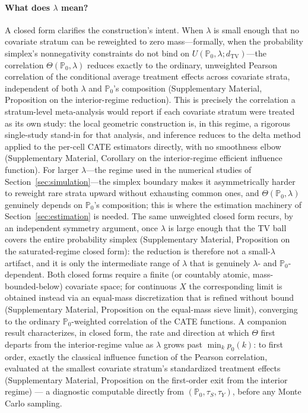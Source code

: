 \documentclass{article}
\newcommand{\PP}{\mathbb{P}}
\begin{document}
\paragraph{What does $\lambda$ mean?} A closed form clarifies the construction's
intent. When $\lambda$ is small enough that no covariate stratum can be reweighted to
zero mass---formally, when the probability simplex's nonnegativity constraints do not
bind on $U(\PP_0,\lambda;d_{\mathrm{TV}})$---the correlation $\Theta(\PP_0,\lambda)$
reduces exactly to the ordinary, unweighted Pearson correlation of the conditional
average treatment effects across covariate strata, independent of both $\lambda$ and
$\PP_0$'s composition (Supplementary Material, Proposition on the interior-regime
reduction). This is precisely the correlation a stratum-level meta-analysis would
report if each covariate stratum were treated as its own study: the local geometric
construction is, in this regime, a rigorous single-study stand-in for that analysis,
and inference reduces to the delta method applied to the per-cell CATE estimators
directly, with no smoothness elbow (Supplementary Material, Corollary on the
interior-regime efficient influence function).
For larger $\lambda$---the regime used in the numerical studies of
Section~\ref{sec:simulation}---the simplex boundary makes it asymmetrically harder to
reweight rare strata upward without exhausting common ones, and $\Theta(\PP_0,\lambda)$
genuinely depends on $\PP_0$'s composition; this is where the estimation machinery of
Section~\ref{sec:estimation} is needed. The same unweighted closed form recurs, by an
independent symmetry argument, once $\lambda$ is large enough that the TV ball covers
the entire probability simplex (Supplementary Material, Proposition on the
saturated-regime closed form): the reduction is therefore not a small-$\lambda$
artifact, and it is only the intermediate range of $\lambda$ that is genuinely
$\lambda$- and $\PP_0$-dependent. Both closed forms require a finite (or countably
atomic, mass-bounded-below) covariate space; for continuous $X$ the corresponding
limit is obtained instead via an equal-mass discretization that is refined without
bound (Supplementary Material, Proposition on the equal-mass sieve limit), converging
to the ordinary $\PP_0$-weighted correlation of the CATE functions. A companion
result characterizes, in closed form, the rate and direction at which $\Theta$ first
departs from the interior-regime value as $\lambda$ grows past $\min_kp_0(k)$: to
first order, exactly the classical influence function of the Pearson correlation,
evaluated at the smallest covariate stratum's standardized treatment effects
(Supplementary Material, Proposition on the first-order exit from the interior
regime) --- a diagnostic computable directly from $(\PP_0,\tau_S,\tau_Y)$, before
any Monte Carlo sampling.
\end{document}
